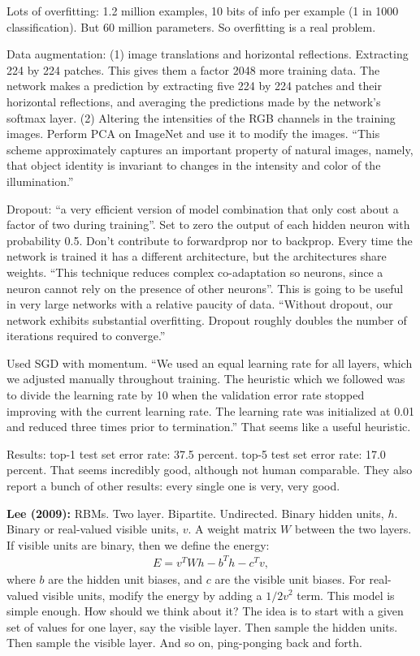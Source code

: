 \documentclass[12pt]{article}
\begin{document}
Lots of overfitting: 1.2 million examples, 10 bits of info per example
(1 in 1000 classification).  But 60 million parameters.  So
overfitting is a real problem.

Data augmentation: (1) image translations and horizontal reflections.
Extracting 224 by 224 patches.  This gives them a factor 2048 more
training data.  The network makes a prediction by extracting five 224
by 224 patches and their horizontal reflections, and averaging the
predictions made by the network's softmax layer. (2) Altering the
intensities of the RGB channels in the training images.  Perform PCA
on ImageNet and use it to modify the images.  ``This scheme
approximately captures an important property of natural images,
namely, that object identity is invariant to changes in the intensity
and color of the illumination.'' 

Dropout: ``a very efficient version of model combination that only
cost about a factor of two during training''.  Set to zero the output
of each hidden neuron with probability 0.5.  Don't contribute to
forwardprop nor to backprop.  Every time the network is trained it has
a different architecture, but the architectures share weights.  ``This
technique reduces complex co-adaptation so neurons, since a neuron
cannot rely on the presence of other neurons''.  This is going to be
useful in very large networks with a relative paucity of data.
``Without dropout, our network exhibits substantial overfitting.
Dropout roughly doubles the number of iterations required to
converge.''

Used SGD with momentum.  ``We used an equal learning rate for all
layers, which we adjusted manually throughout training.  The heuristic
which we followed was to divide the learning rate by 10 when the
validation error rate stopped improving with the current learning
rate.  The learning rate was initialized at 0.01 and reduced three
times prior to termination.''   That seems like a useful heuristic.

Results: top-1 test set error rate: 37.5 percent.  top-5 test set
error rate: 17.0 percent.  That seems incredibly good, although not
human comparable.  They also report a bunch of other results: every
single one is very, very good.

\textbf{Lee (2009):} RBMs.  Two layer.  Bipartite.  Undirected.
Binary hidden units, $h$.  Binary or real-valued visible units, $v$.
A weight matrix $W$ between the two layers.  If visible units are
binary, then we define the energy:
\begin{eqnarray}
  E = v^T W h - b^T h-c^T v,
\end{eqnarray}
where $b$ are the hidden unit biases, and $c$ are the visible unit
biases.  For real-valued visible units, modify the energy by adding a
$1/2 v^2$ term.  This model is simple enough.  How should we think
about it?  The idea is to start with a given set of values for one
layer, say the visible layer.  Then sample the hidden units.  Then
sample the visible layer.  And so on, ping-ponging back and forth.
\end{document}
